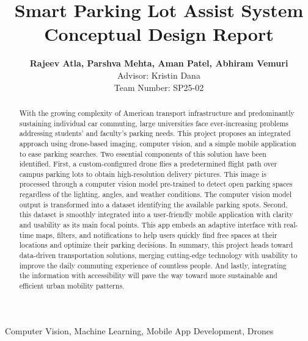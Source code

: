 \documentclass[conference]{IEEEtran}
\begin{document}
\title{Smart Parking Lot Assist System\\
{\footnotesize \textbf{Conceptual Design Report}}
}

\author{
\textbf{Rajeev Atla, Parshva Mehta, Aman Patel, Abhiram Vemuri} \\
Advisor: Kristin Dana\\
Team Number: SP25-02 
}

\maketitle

\begin{abstract}
    With the growing complexity of American transport infrastructure and predominantly sustaining individual car commuting, large universities face ever-increasing problems addressing students’ and faculty’s parking needs. 
    This project proposes an integrated approach using drone-based imaging, 
    computer vision, 
    and a simple mobile application to ease parking searches. 
    Two essential components of this solution have been identified. 
    First, 
    a custom-configured drone flies a predetermined flight path over campus parking lots to obtain high-resolution delivery pictures. 
    This image is processed through a computer vision model pre-trained to detect open parking spaces regardless of the lighting, 
    angles, 
    and weather conditions. 
    The computer vision model output is transformed into a dataset identifying the available parking spots. 
    Second, 
    this dataset is smoothly integrated into a user-friendly mobile application with clarity and usability as its main focal points. 
    This app embeds an adaptive interface with real-time maps, 
    filters, 
    and notifications to help users quickly find free spaces at their locations and optimize their parking decisions. 
    In summary, 
    this project heads toward data-driven transportation solutions, 
    merging cutting-edge technology with usability to improve the daily commuting experience of countless people. 
    And lastly, 
    integrating the information with accessibility will pave the way toward more sustainable and efficient urban mobility patterns.
\end{abstract}

\begin{IEEEkeywords}
Computer Vision, Machine Learning, Mobile App Development, Drones
\end{IEEEkeywords}
\end{document}

